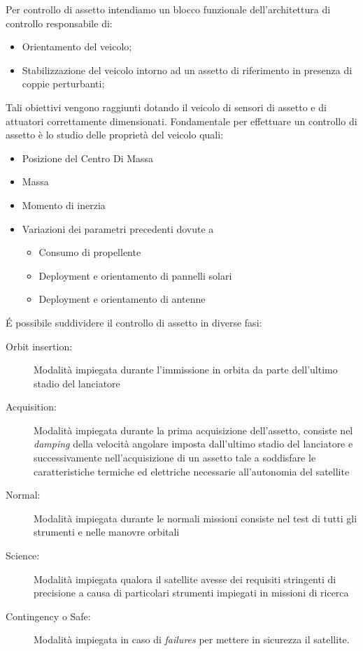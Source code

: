 
Per controllo di assetto intendiamo un blocco funzionale dell'architettura di
controllo responsabile di:
\begin{itemize}
  \item Orientamento del veicolo;
  \item Stabilizzazione del veicolo intorno ad un assetto di riferimento in
  presenza di coppie perturbanti;
\end{itemize}
Tali obiettivi vengono raggiunti dotando il veicolo di sensori di assetto e di
attuatori correttamente dimensionati.
Fondamentale per effettuare un controllo di assetto è lo studio delle proprietà
del veicolo quali:
\begin{itemize}
  \item Posizione del Centro Di Massa
  \item Massa
  \item Momento di inerzia
  \item Variazioni dei parametri precedenti dovute a
  \begin{itemize}
    \item Consumo di propellente
    \item Deployment e orientamento di pannelli solari
    \item Deployment e orientamento di antenne
  \end{itemize}
\end{itemize}

\'{E} possibile suddividere il controllo di assetto in diverse fasi:
\begin{description}
\item[Orbit insertion:] Modalità impiegata durante l'immissione in orbita da
parte dell'ultimo stadio del lanciatore
\item[Acquisition:] Modalità impiegata durante la prima acquisizione
dell'assetto, consiste nel \emph{damping} della velocità angolare imposta
dall'ultimo stadio del lanciatore e successivamente nell'acquisizione di un
assetto tale a soddisfare le caratteristiche termiche ed elettriche necessarie
all'autonomia del satellite
\item[Normal:] Modalità impiegata durante le normali missioni consiste nel test
di tutti gli strumenti e nelle manovre orbitali
\item[Science:] Modalità impiegata qualora il satellite avesse dei requisiti
stringenti di precisione a causa di particolari strumenti impiegati in missioni
di ricerca
\item[Contingency o Safe:] Modalità impiegata in caso di \emph{failures} per
mettere in sicurezza il satellite.
\end{description}
